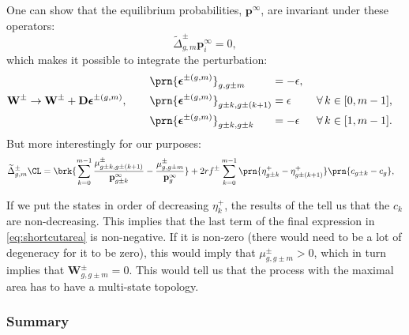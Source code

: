 \documentclass[12pt]{article}
\newcommand{\eq}{\mathbf{p}^\infty}
\newcommand{\D}{\mathbf{D}}
\newcommand{\w}{\mathbf{w}}
\newcommand{\W}{\mathbf{W}}
\begin{document}
One can show that the equilibrium probabilities, $\eq$, are invariant under these operators:
%
\begin{equation}\label{eq:shortcutprob}
  \widetilde{\Delta}^\pm_{g,m} \eq_i = 0,
\end{equation}
%
which makes it possible to integrate the perturbation:
%
\begin{equation}\label{eq:shortcutfinite}
  \W^\pm \to \W^\pm + \D\boldsymbol{\epsilon}^{\pm(g,m)},
  \qquad
  \begin{aligned}
    &\prn{\boldsymbol{\epsilon}^{\pm(g,m)}}_{g,g\pm m}
      &\!\!\!\!\!\!&= -\epsilon,\\
    &\prn{\boldsymbol{\epsilon}^{\pm(g,m)}}_{g\pm k,g\pm(k+1)}
      &\!\!\!\!\!\!&= \epsilon
        &\;
        &\forall\, k \in [0,m-1],\\
    &\prn{\boldsymbol{\epsilon}^{\pm(g,m)}}_{g\pm k,g\pm k}
      &\!\!\!\!\!\!&= -\epsilon
        &
        &\forall\, k \in [1,m-1].
  \end{aligned}
\end{equation}
%
But more interestingly for our purposes:
%
\begin{align}
\label{eq:shortcutarea}
    \widetilde{\Delta}^\pm_{g,m}\CL &=
      \brk{ \sum_{k=0}^{m-1} \frac{\mu^\pm_{g\pm k,g\pm(k+1)}}{\eq_{g\pm k}}
      - \frac{\mu^\pm_{g,g\pm m}}{\eq_g}}
      + 2rf^\pm \sum_{k=0}^{m-1} \prn{\eta^+_{g\pm k} - \eta^+_{g\pm(k+1)}} \prn{c_{g\pm k} - c_{g}},
\end{align}
%

If we put the states in order of decreasing $\eta^+_k$, the results of the  tell us that the $c_k$ are non-decreasing.
This implies that the last term of the final expression in \eqref{eq:shortcutarea} is non-negative.
If it is non-zero (there would need to be a lot of degeneracy for it to be zero), this would imply that $\mu^\pm_{g,g\pm m}>0$, which in turn implies that $\W^\pm_{g,g\pm m}=0$.
This would tell us that the process with the maximal area has to have a multi-state topology.


\subsubsection{Summary}\label{sec:KTsummary}
\end{document}
